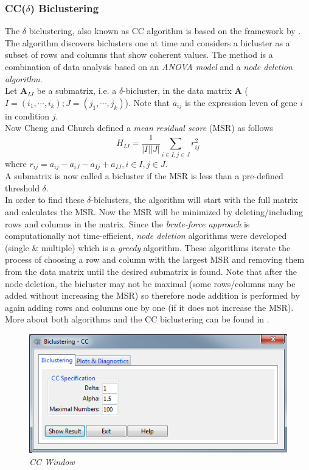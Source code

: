 \documentclass[a4paper]{article}\usepackage[]{graphicx}\usepackage[]{color}
\begin{document}
\subsubsection{CC($\delta$) Biclustering}
The $\delta$ biclustering, also known as CC algorithm is based on the framework
by \citet{Cheng2000}. The algorithm discovers biclusters one at time and
considers a bicluster as a subset of rows and columns that show coherent values.
The method is a combination of data analysis based on an {\it ANOVA model} and a
{\it node deletion algorithm}.\\
Let $\mathbf{A}_{IJ}$ be a submatrix, i.e. a $\delta$-bicluster, in the data
matrix $\mathbf{A}$ ($I=(i_1,\cdots,i_k);J=(j_1,\cdots,j_k)$). Note that
$a_{ij}$ is the expression leven of gene $i$ in condition $j$.\\
Now Cheng and Church defined a {\it mean residual score} (MSR) as follows
$$
H_{IJ} = \frac{1}{|I||J|} \sum_{i \in I,j \in J}r_{ij}^2
$$
where $r_{ij}=a_{ij}-a_{iJ}-a_{Ij}+a_{IJ},i \in I,j \in J$.\\
A submatrix is now called a bicluster if the MSR is less than a pre-defined
threshold $\delta$.\\
In order to find these $\delta$-biclusters, the algorithm will start with the
full matrix and calculates the MSR. Now the MSR will be minimized by
deleting/including rows and columns in the matrix. Since the {\it brute-force
approach} is computationally not time-efficient, {\it node deletion} algorithms
were developed (single \& multiple) which is a {\it greedy} algorithm. These
algorithms iterate the process of choosing a row and column with the largest MSR
and removing them from the data matrix until the desired submatrix is found.
Note that after the node deletion, the bicluster may not be maximal (some
rows/columns may be added without increasing the MSR) so therefore node
addition is performed by again adding rows and columns one by one (if it does
not increase the MSR).\\
More about both algorithms and the CC biclustering can be found in \citet{Cheng2000}.
\begin{figure}[H]
\centering
\includegraphics[scale=0.5]{figures/cc_clusttab.png}
\caption{{\it CC Window}\label{cc_clusttab}}
\end{figure}
\end{document}
